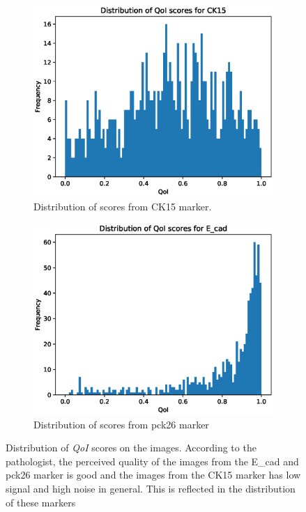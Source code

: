 \begin{figure}[ht!]
\begin{subfigure}{.5\textwidth}
  \centering
  \includegraphics[scale=0.37]{img/SPIE/CK15_probs_smote_pca.eps}
  \caption{Distribution of scores from CK15 marker.}
  \label{fig:ck15_probs}
\end{subfigure}%
\begin{subfigure}{.5\textwidth}
  \centering
  \includegraphics[scale=0.37]{img/SPIE/pck26_probs_smote_pca.eps}
  \caption{Distribution of scores from pck26 marker}
  \label{fig:pck26_probs}
\end{subfigure}
\caption{Distribution of \textit{QoI} scores on the images. According to the pathologist, the perceived quality of the images from the E\_cad and pck26 marker is good and the images from the CK15 marker has low signal and high noise in general.  This is reflected in the distribution of these markers}
\label{fig:distribution}
\end{figure}

